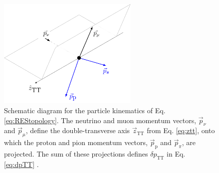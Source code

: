 \begin{figure}[t]
     \centering

         \includegraphics[width=0.6\textwidth]{figures/ch6-TKI/source_dpttdef_wScreen.pdf}
        \caption[Schematic diagram defining the double transverse axis.]{Schematic diagram for the particle kinematics of Eq. \ref{eq:REStopology}. The neutrino and muon momentum vectors, $\Vec{p}_\nu$ and $\Vec{p}_\mu$, define the double-transverse axis $\Vec{z}_\text{TT}$ from Eq. \ref{eq:ztt}, onto which the proton and pion momentum vectors, $\Vec{p}_\text{p}$ and $\Vec{p}_\pi$, are projected. The sum of these projections defines $\delta p_\text{TT}$ in Eq. \ref{eq:dpTT} \cite{Lu}. } \label{fig:source_dpttdef_wScreen.pdf}
\end{figure}

